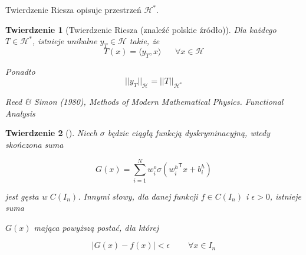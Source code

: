 \documentclass[11pt]{book}
\newtheorem{theorem}{Twierdzenie}[section]
\theoremstyle{definition}
\begin{document}
Twierdzenie Riesza opisuje przestrzeń $\mathcal{H^*}$.  


\begin{theorem}[Twierdzenie Riesza (znaleźć polskie źródło)]
	
	Dla każdego $T \in \mathcal{H^*}$, istnieje unikalne $y_T \in \mathcal{H}$ takie, że $$T(x) = \langle y_T, x \rangle \;\;\;\;\;\; \forall x \in \mathcal{H} $$
	
	
	Ponadto $$||y_T ||_{\mathcal{H}}  = ||T||_{\mathcal{H^*}}$$
	
	Reed \& Simon (1980), Methods of Modern Mathematical Physics. Functional Analysis
	
\end{theorem}


\begin{theorem}[]
	
	Niech $\sigma$ będzie ciągłą funkcją dyskryminacyjną, wtedy skończona suma
	
	\begin{equation}
	G\left(x\right) = \sum_{i=1}^{N} w^{o}_i \sigma\left({w^h_i}^{\mathsf{T}}x + b^h_i\right)
	\end{equation}
	
	jest gęsta w $C(I_n)$. Innymi słowy, dla danej funkcji $f \in C(I_n)$ i $\epsilon >0$, istnieje suma
	
	$G(x)$ mająca powyższą postać, dla której
	
	$$
	|G(x) - f(x)| < \epsilon \;\;\;\;\;\;\;\; \forall x \in I_n
	$$
\end{theorem}
\end{document}
